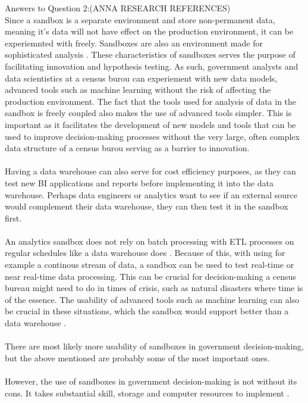 \newpage Answers to Question 2:(ANNA RESEARCH REFERENCES)
\\Since a sandbox is a separate environment and store non-permanent data\cite{l2video}, meaning it's data will not have effect on 
the production environment, it can be experiemnted with freely. Sandboxes are also an environment made for sophisticated analysis \cite{l2video}.
These characteristics of sandboxes serves the purpose of facilitating innovation and hypothesis testing.
As such, government analysts and data scientistics at a census burou can experiement with new data models, advanced tools such as machine learning
without the risk of affecting the production environment. The fact that the tools used for analysis of data in the sandbox is freely coupled \cite{l2video} also makes the use of advanced tools simpler.
This is important as it facilitates the development of new models and tools that can be used to improve decision-making processes
without the very large, often complex data structure of a census burou serving as a barrier to innovation.
\\\\
Having a data warehouse can also serve for cost efficiency purposes, as they can test new BI applications and reports before implementing it into the data warehouse.
Perhaps data engineers or analytics want to see if an external source would complement their data warehouse, they can then test it in the sandbox first.
\\\\ 
An analytics sandbox does not rely on batch processing with ETL processes on regular schedules like a data warehouse does \cite{l2video}.
Because of this, with using for example a continous stream of data, 
a sandbox can be used to test real-time or near real-time data processing.
This can be crucial for decision-making a census bureau might need to do in times of crisis, 
such as natural disasters where time is of the essence. 
The usability of advanced tools such as machine learning can also be crucial in these situations, 
which the sandbox would support better than a data warehouse \cite{l2video}.
\\\\
There are most likely more usability of sandboxes in government decision-making,
but the above mentioned are probably some of the most important ones.
\\\\
However, the use of sandboxes in government decision-making is not without its cons. It takes substantial skill, storage and computer resources to implement \cite{l2video}.
